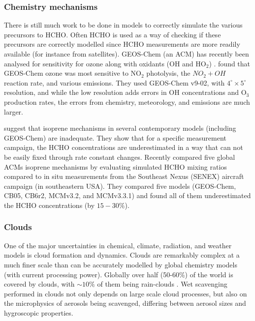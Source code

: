     \subsubsection{Chemistry mechanisms}
      \label{LR:Models:Unc:Chemistry}
      There is still much work to be done in models to correctly simulate the various precursors to HCHO.
      Often HCHO is used as a way of checking if these precursors are correctly modelled since HCHO measurements are more readily available (for instance from satellites).
      GEOS-Chem (an ACM) has recently been analysed for sensitivity for ozone along with oxidants (OH and HO$_2$) \citep{Christian2017}.
      \cite{Christian2017} found that GEOS-Chem ozone was most sensitive to NO$_2$ photolysis, the $NO_2 + OH$ reaction rate, and various emissions.
      They used GEOS-Chem v9-02, with $4^{\circ} \times 5^{\circ}$ resolution, and while the low resolution adds errors in OH concentrations and O$_3$ production rates, the errors from chemistry, meteorology, and emissions are much larger.

      \citet{Marvin2017} suggest that isoprene mechanisms in several contemporary models (including GEOS-Chem) are inadequate. 
      They show that for a specific measurement campaign, the HCHO concentrations are underestimated in a way that can not be easily fixed through rate constant changes.
      Recently \cite{Marvin2017} compared five global ACMs isoprene mechanisms by evaluating simulated HCHO mixing ratios compared to in situ measurements from the Southeast Nexus (SENEX) aircraft campaign (in southeastern USA).
      They compared five models (GEOS-Chem, CB05, CB6r2, MCMv3.2, and MCMv3.3.1) and found all of them underestimated the HCHO concentrations (by $15 - 30\%$).
    
    \subsubsection{Clouds}
      \label{LR:Models:Unc:Clouds}
      One of the major uncertainties in chemical, climate, radiation, and weather models is cloud formation and dynamics. 
      Clouds are remarkably complex at a much finer scale than can be accurately modelled by global chemistry models (with current processing power).
      Globally over half (50-60\%) of the world is covered by clouds, with $\sim10\%$ of them being rain-clouds \citep{Kanakidou2005}.
      Wet scavenging performed in clouds not only depends on large scale cloud processes, but also on the microphysics of aerosols being scavenged, differing between aerosol sizes and hygroscopic properties.
      
